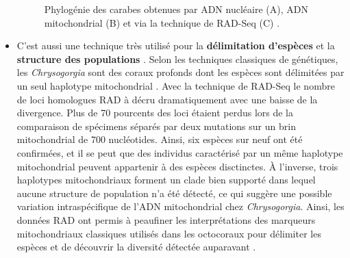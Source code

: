 \documentclass[a4paper]{article}
\begin{document}
\begin{itemize}
\begin{figure}[!h]
\caption{Phylogénie des carabes obtenues par ADN nucléaire (A), ADN mitochondrial (B) et via la technique de RAD-Seq (C)\cite{cruaud2014empirical} \label{4}.}
\end{figure}

\item C'est aussi une technique très utilisé pour la \textbf{délimitation d'espèces} \cite{herrera2015rad}\cite{Pante:2015aa} et la \textbf{structure des populations} \cite{Pante:2015aa}. Selon les techniques classiques de génétiques, les \textit{Chrysogorgia} sont des coraux profonds dont les espèces sont délimitées par un seul haplotype mitochondrial \cite{herrera2015rad}\cite{Pante:2015aa}. Avec la technique de RAD-Seq le nombre de loci homologues RAD à décru dramatiquement  avec une baisse de la divergence. Plus de 70 pourcents des loci étaient perdus lors de la comparaison de spécimens séparés par deux mutations sur un brin mitochondrial de 700 nucléotides. Ainsi, six espèces sur neuf ont été confirmées, et il se peut que des individus caractérisé par un même haplotype mitochondrial peuvent appartenir à des espèces disctinctes. À l'inverse, trois haplotypes mitochondriaux forment un clade bien supporté dans lequel aucune structure de population n'a été détecté, ce qui suggère une possible variation intraspécifique de l'ADN mitochondrial chez \textit{Chrysogorgia}. Ainsi, les données RAD ont permis à peaufiner les interprétations des marqueurs mitochondriaux classiques utilisés dans les octocoraux pour délimiter les espèces et de découvrir la diversité détectée auparavant \cite{Pante:2015aa}.

\end{itemize}
\end{document}
